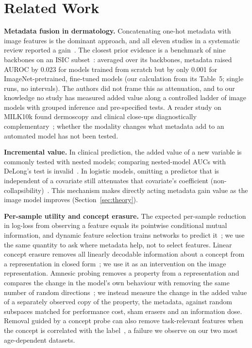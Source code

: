 \documentclass[conference]{IEEEtran}
\begin{document}
\section{Related Work}
\textbf{Metadata fusion in dermatology.} Concatenating one-hot metadata with image features is the dominant approach, and all eleven studies in a systematic review reported a gain~\cite{hohn2021review}. The closest prior evidence is a benchmark of nine backbones on an ISIC subset~\cite{ahammed2025metadata}: averaged over its backbones, metadata raised AUROC by 0.023 for models trained from scratch but by only 0.001 for ImageNet-pretrained, fine-tuned models (our calculation from its Table~5; single runs, no intervals). The authors did not frame this as attenuation, and to our knowledge no study has measured added value along a controlled ladder of image models with grouped inference and pre-specified tests. A reader study on MILK10k found dermoscopy and clinical close-ups diagnostically complementary~\cite{muller2026milk}; whether the modality changes what metadata add to an automated model has not been tested.

\textbf{Incremental value.} In clinical prediction, the added value of a new variable is commonly tested with nested models; comparing nested-model AUCs with DeLong's test is invalid~\cite{demler2012}. In logistic models, omitting a predictor that is independent of a covariate still attenuates that covariate's coefficient (non-collapsibility)~\cite{gail1984}. This mechanism makes directly acting metadata gain value as the image model improves (Section~\ref{sec:theory}).

\textbf{Per-sample utility and concept erasure.} The expected per-sample reduction in log-loss from observing a feature equals its pointwise conditional mutual information, and dynamic feature selection trains networks to predict it~\cite{covert2023dfs,gadgil2024cmi}; we use the same quantity to ask where metadata help, not to select features. Linear concept erasure removes all linearly decodable information about a concept from a representation in closed form~\cite{belrose2023leace}; we use it as an intervention on the image representation. Amnesic probing removes a property from a representation and compares the change in the model's own behaviour with removing the same number of random directions~\cite{elazar2021amnesic}; we instead measure the change in the added value of a separately observed copy of the property, the metadata, against random subspaces matched for performance cost, sham erasers and an information dose. Removal guided by a concept probe can also remove task-relevant features when the concept is correlated with the label~\cite{kumar2022probing}, a failure we observe on our two most age-dependent datasets.
\end{document}
